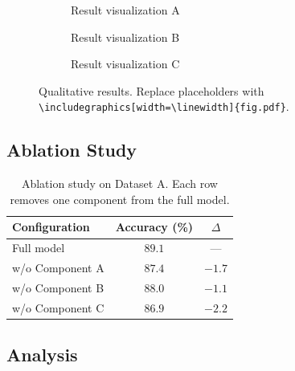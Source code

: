 \documentclass[10pt]{article} %
\theoremstyle{definition}
\theoremstyle{remark}
\begin{document}
\begin{figure}[t]
\centering
\begin{subfigure}[b]{0.32\linewidth}
    \centering
    \fbox{\rule[-.5cm]{0cm}{3cm}\rule{2.5cm}{0cm}}
    \caption{Result visualization A}
    \label{fig:result_a}
\end{subfigure}
\hfill
\begin{subfigure}[b]{0.32\linewidth}
    \centering
    \fbox{\rule[-.5cm]{0cm}{3cm}\rule{2.5cm}{0cm}}
    \caption{Result visualization B}
    \label{fig:result_b}
\end{subfigure}
\hfill
\begin{subfigure}[b]{0.32\linewidth}
    \centering
    \fbox{\rule[-.5cm]{0cm}{3cm}\rule{2.5cm}{0cm}}
    \caption{Result visualization C}
    \label{fig:result_c}
\end{subfigure}
\caption{Qualitative results. Replace placeholders with \texttt{\textbackslash includegraphics[width=\textbackslash linewidth]\{fig.pdf\}}.}
\label{fig:results}
\end{figure}

\subsection{Ablation Study}
\label{sec:ablation}

\begin{table}[t]
\caption{Ablation study on Dataset A. Each row removes one component from the full model.}
\label{tab:ablation}
\begin{center}
\begin{tabular}{lcc}
\toprule
\textbf{Configuration}       & \textbf{Accuracy (\%)} & \textbf{$\Delta$} \\
\midrule
Full model                    & $\mathbf{89.1}$        & ---                \\
\quad w/o Component A         & $87.4$                 & $-1.7$             \\
\quad w/o Component B         & $88.0$                 & $-1.1$             \\
\quad w/o Component C         & $86.9$                 & $-2.2$             \\
\bottomrule
\end{tabular}
\end{center}
\end{table}

\subsection{Analysis}
\label{sec:analysis}
\end{document}
